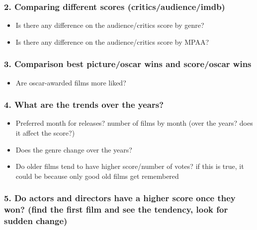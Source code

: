\documentclass[]{article}
\providecommand{\tightlist}{%
  \setlength{\itemsep}{0pt}\setlength{\parskip}{0pt}}
\begin{document}
\subsubsection{2. Comparing different scores
(critics/audience/imdb)}\label{comparing-different-scores-criticsaudienceimdb}

\begin{itemize}
\tightlist
\item
  Is there any difference on the audience/critics score by genre?
\item
  Is there any difference on the audience/critics score by MPAA?
\end{itemize}

\subsubsection{3. Comparison best picture/oscar wins and score/oscar
wins}\label{comparison-best-pictureoscar-wins-and-scoreoscar-wins}

\begin{itemize}
\tightlist
\item
  Are oscar-awarded films more liked?
\end{itemize}

\subsubsection{4. What are the trends over the
years?}\label{what-are-the-trends-over-the-years}

\begin{itemize}
\tightlist
\item
  Preferred month for releases? number of films by month (over the
  years? does it affect the score?)
\item
  Does the genre change over the years?
\item
  Do older films tend to have higher score/number of votes? if this is
  true, it could be because only good old films get remembered
\end{itemize}

\subsubsection{5. Do actors and directors have a higher score once they
won? (find the first film and see the tendency, look for sudden
change)}\label{do-actors-and-directors-have-a-higher-score-once-they-won-find-the-first-film-and-see-the-tendency-look-for-sudden-change}
\end{document}
